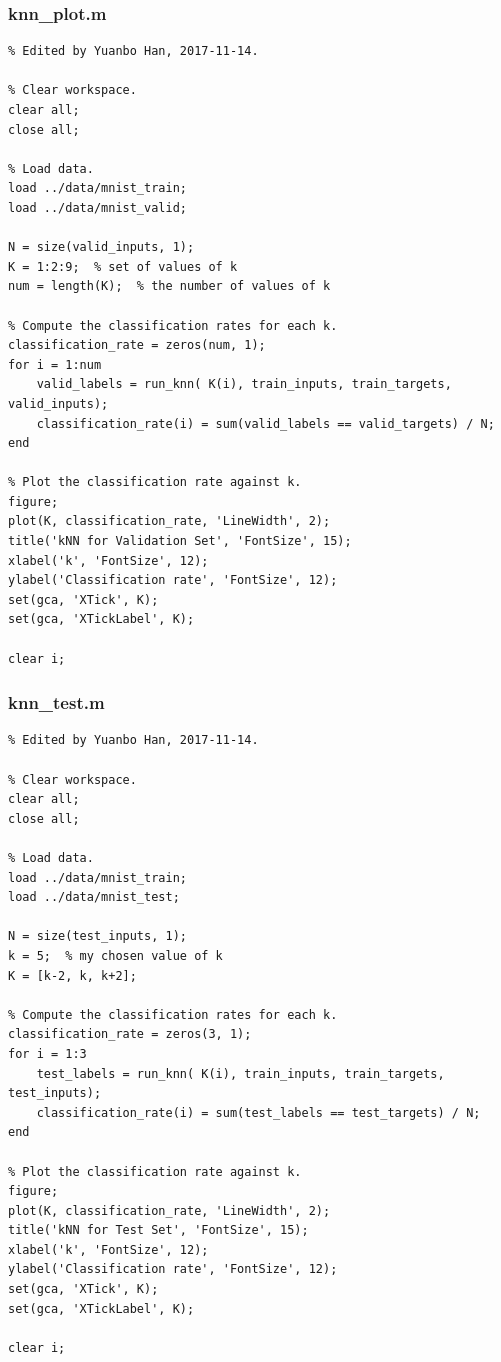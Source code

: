 \documentclass{article}
\begin{document}
\subsubsection{knn\_plot.m}
\begin{lstlisting}
% Edited by Yuanbo Han, 2017-11-14.

% Clear workspace.
clear all;
close all;

% Load data.
load ../data/mnist_train;
load ../data/mnist_valid;

N = size(valid_inputs, 1);
K = 1:2:9;  % set of values of k
num = length(K);  % the number of values of k

% Compute the classification rates for each k.
classification_rate = zeros(num, 1);
for i = 1:num
    valid_labels = run_knn( K(i), train_inputs, train_targets, valid_inputs);
    classification_rate(i) = sum(valid_labels == valid_targets) / N;
end

% Plot the classification rate against k.
figure;
plot(K, classification_rate, 'LineWidth', 2);
title('kNN for Validation Set', 'FontSize', 15);
xlabel('k', 'FontSize', 12);
ylabel('Classification rate', 'FontSize', 12);
set(gca, 'XTick', K);
set(gca, 'XTickLabel', K);

clear i;
\end{lstlisting}

\subsubsection{knn\_test.m}
\begin{lstlisting}
% Edited by Yuanbo Han, 2017-11-14.

% Clear workspace.
clear all;
close all;

% Load data.
load ../data/mnist_train;
load ../data/mnist_test;

N = size(test_inputs, 1);
k = 5;  % my chosen value of k
K = [k-2, k, k+2];

% Compute the classification rates for each k.
classification_rate = zeros(3, 1);
for i = 1:3
    test_labels = run_knn( K(i), train_inputs, train_targets, test_inputs);
    classification_rate(i) = sum(test_labels == test_targets) / N;
end

% Plot the classification rate against k.
figure;
plot(K, classification_rate, 'LineWidth', 2);
title('kNN for Test Set', 'FontSize', 15);
xlabel('k', 'FontSize', 12);
ylabel('Classification rate', 'FontSize', 12);
set(gca, 'XTick', K);
set(gca, 'XTickLabel', K);

clear i;
\end{lstlisting}
\end{document}
